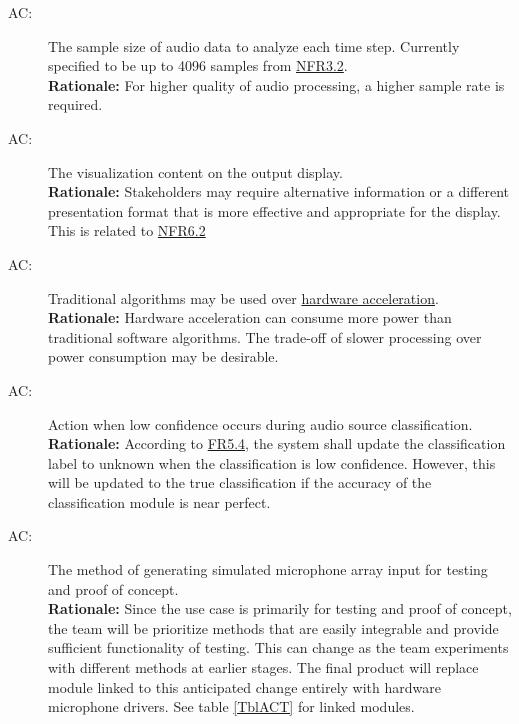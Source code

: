 \documentclass[12pt, titlepage]{article}
\newcounter{acnum}
\newcommand{\actheacnum}{AC\theacnum}
\begin{document}
\begin{description}
\item[ \actheacnum \label{SampleSize}:]
  The sample size of audio data to analyze each time step. Currently specified
  to be up to 4096 samples from \hyperref[SRS-NFR3_3]{NFR3.2}. \\
  \textbf{Rationale:} For higher quality of audio processing, a higher sample
  rate is required.

\item[ \actheacnum \label{acVizContent}:] 
  The visualization content on the output display. \\
  \textbf{Rationale:} Stakeholders may require alternative information or a
  different presentation format that is more effective and appropriate for the
  display. This is related to \hyperref[SRS-NFR6_2]{NFR6.2}

\item[ \actheacnum \label{acHardwareAccel}:]
  Traditional algorithms may be used over
  \hyperref[SRS-def:hardware_acceleration]{hardware acceleration}. \\
  \textbf{Rationale:} Hardware acceleration can consume more power than
  traditional software algorithms. The trade-off of slower processing over power
  consumption may be desirable.

\item[ \actheacnum \label{acConfidenceAction}:]
  Action when low confidence occurs during audio source classification. \\
  \textbf{Rationale:} According to \hyperref[SRS-FR5_4]{FR5.4}, the system 
  shall update the classification label to unknown when the classification 
  is low confidence. However, this will be updated to the true classification 
  if the accuracy of the classification module is near perfect.

\item[ \actheacnum \label{acAudioGen}:] The method of
  generating simulated microphone array input for testing and proof of concept.
  \\
  \textbf{Rationale:} Since the use case is primarily for testing and proof of
  concept, the team will be prioritize methods that are easily integrable and
  provide sufficient functionality of testing. This can change as the team
  experiments with different methods at earlier stages. The final product will
  replace module linked to this anticipated change entirely with hardware
  microphone drivers. See table \ref{TblACT} for linked modules.


\end{description}
\end{document}

